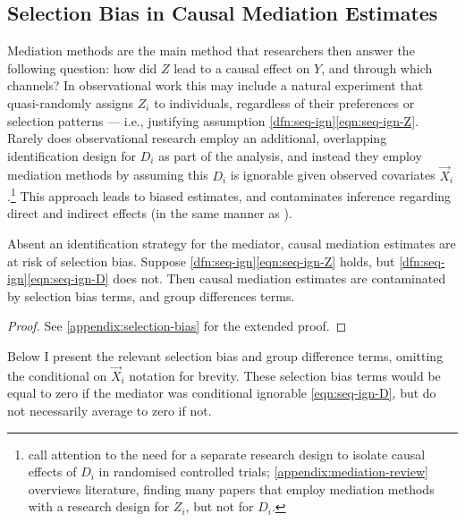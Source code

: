 \subsection{Selection Bias in Causal Mediation Estimates}
Mediation methods are the main method that researchers then answer the following question: how did $Z$ lead to a causal effect on $Y$, and through which channels?
In observational work this may include a natural experiment that quasi-randomly assigns $Z_i$ to individuals, regardless of their preferences or selection patterns --- i.e., justifying assumption \ref{dfn:seq-ign}\eqref{eqn:seq-ign-Z}.
Rarely does observational research employ an additional, overlapping identification design for $D_i$ as part of the analysis, and instead they employ mediation methods by assuming this $D_i$ is ignorable given observed covariates $\vec X_i$.\footnote{
    \cite{imai2013experimental} call attention to the need for a separate research design to isolate causal effects of $D_i$ in randomised controlled trials; \autoref{appendix:mediation-review} overviews literature, finding many papers that employ mediation methods with a research design for $Z_i$, but not for $D_i$.
}
This approach leads to biased estimates, and contaminates inference regarding direct and indirect effects (in the same manner as \citealt{heckman1998characterizing}).

\begin{theorem}
    \label{thm:selection-bias}
    Absent an identification strategy for the mediator, causal mediation estimates are at risk of selection bias.
    Suppose \ref{dfn:seq-ign}\eqref{eqn:seq-ign-Z} holds, but \ref{dfn:seq-ign}\eqref{eqn:seq-ign-D} does not.
    Then causal mediation estimates are contaminated by selection bias terms, and group differences terms.
\end{theorem}
\begin{proof}
    See \autoref{appendix:selection-bias} for the extended proof.
\end{proof}
Below I present the relevant selection bias and group difference terms, omitting the conditional on $\vec X_i$ notation for brevity.
These selection bias terms would be equal to zero if the mediator was conditional ignorable \eqref{eqn:seq-ign-D}, but do not necessarily average to zero if not.

